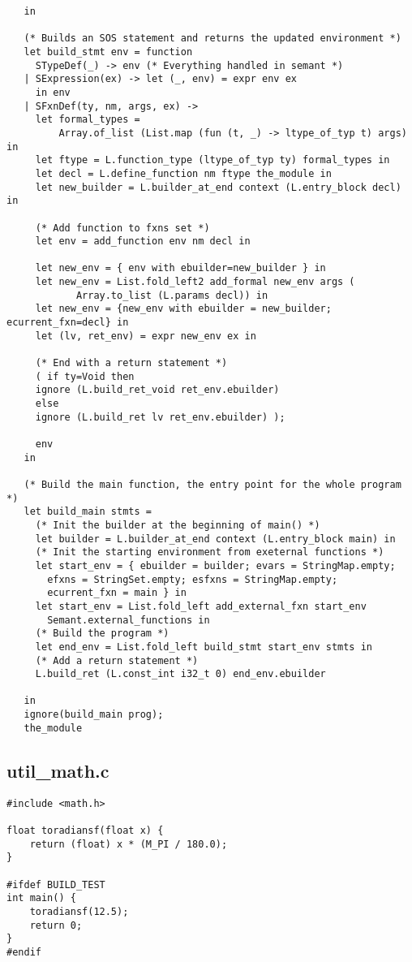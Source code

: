 \documentclass[main.tex]{subfiles}
\begin{document}
\begin{lstlisting}
   in

   (* Builds an SOS statement and returns the updated environment *)
   let build_stmt env = function
     STypeDef(_) -> env (* Everything handled in semant *)
   | SExpression(ex) -> let (_, env) = expr env ex 
     in env
   | SFxnDef(ty, nm, args, ex) ->
     let formal_types =
         Array.of_list (List.map (fun (t, _) -> ltype_of_typ t) args) in
     let ftype = L.function_type (ltype_of_typ ty) formal_types in
     let decl = L.define_function nm ftype the_module in
     let new_builder = L.builder_at_end context (L.entry_block decl) in

     (* Add function to fxns set *)
     let env = add_function env nm decl in

     let new_env = { env with ebuilder=new_builder } in
     let new_env = List.fold_left2 add_formal new_env args (
            Array.to_list (L.params decl)) in
     let new_env = {new_env with ebuilder = new_builder; ecurrent_fxn=decl} in
     let (lv, ret_env) = expr new_env ex in
     
     (* End with a return statement *)
     ( if ty=Void then
     ignore (L.build_ret_void ret_env.ebuilder)
     else
     ignore (L.build_ret lv ret_env.ebuilder) );

     env
   in
  
   (* Build the main function, the entry point for the whole program *)
   let build_main stmts = 
     (* Init the builder at the beginning of main() *)
     let builder = L.builder_at_end context (L.entry_block main) in
     (* Init the starting environment from exeternal functions *)
     let start_env = { ebuilder = builder; evars = StringMap.empty;
       efxns = StringSet.empty; esfxns = StringMap.empty; 
       ecurrent_fxn = main } in
     let start_env = List.fold_left add_external_fxn start_env
       Semant.external_functions in
     (* Build the program *)
     let end_env = List.fold_left build_stmt start_env stmts in
     (* Add a return statement *)
     L.build_ret (L.const_int i32_t 0) end_env.ebuilder    

   in
   ignore(build_main prog);
   the_module
\end{lstlisting}

\subsection{util_math.c}
\begin{lstlisting}
#include <math.h>

float toradiansf(float x) {
    return (float) x * (M_PI / 180.0);
} 

#ifdef BUILD_TEST
int main() {
    toradiansf(12.5);
    return 0;
}
#endif
\end{lstlisting}
\end{document}

